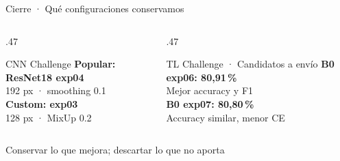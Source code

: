 \documentclass[aspectratio=169]{beamer}
\newcommand{\idea}[1]{\begin{center}\large\color{blue!65!black}#1\end{center}}
\begin{document}
\begin{frame}{Cierre · Qué configuraciones conservamos}
\begin{center}
\begin{minipage}{.88\textwidth}
\begin{columns}[T,onlytextwidth]
\begin{column}{.47\textwidth}
\begin{block}{CNN Challenge}
\textbf{Popular: ResNet18 exp04}\\
192 px · smoothing 0.1\\[8pt]
\textbf{Custom: exp03}\\
128 px · MixUp 0.2
\end{block}
\end{column}
\begin{column}{.47\textwidth}
\begin{block}{TL Challenge · Candidatos a envío}
\textbf{B0 exp06: 80,91\,\%}\\
Mejor accuracy y F1\\[8pt]
\textbf{B0 exp07: 80,80\,\%}\\
Accuracy similar, menor CE
\end{block}
\end{column}
\end{columns}
\end{minipage}
\end{center}
\vspace{.3cm}
\idea{Conservar lo que mejora; descartar lo que no aporta}
\end{frame}
\end{document}
